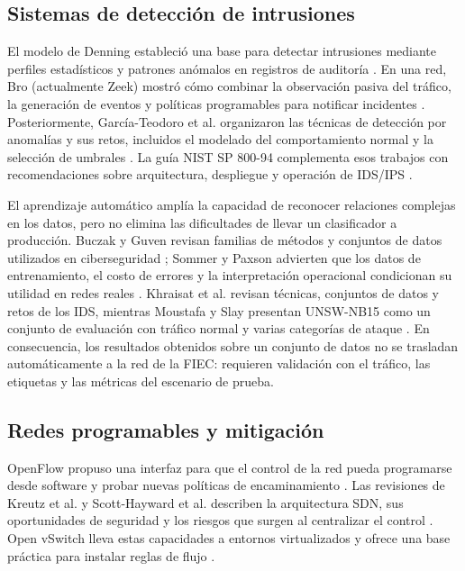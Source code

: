 \subsection{Sistemas de detecci\'on de intrusiones}

El modelo de Denning estableci\'o una base para detectar intrusiones mediante perfiles estad\'isticos y patrones an\'omalos en registros de auditor\'ia \parencite{denning1987}. En una red, Bro (actualmente Zeek) mostr\'o c\'omo combinar la observaci\'on pasiva del tr\'afico, la generaci\'on de eventos y pol\'iticas programables para notificar incidentes \parencite{paxson1999}. Posteriormente, Garc\'ia-Teodoro et al. organizaron las t\'ecnicas de detecci\'on por anomal\'ias y sus retos, incluidos el modelado del comportamiento normal y la selecci\'on de umbrales \parencite{garciateodoro2009}. La gu\'ia NIST SP 800-94 complementa esos trabajos con recomendaciones sobre arquitectura, despliegue y operaci\'on de IDS/IPS \parencite{nist80094}.

El aprendizaje autom\'atico ampl\'ia la capacidad de reconocer relaciones complejas en los datos, pero no elimina las dificultades de llevar un clasificador a producci\'on. Buczak y Guven revisan familias de m\'etodos y conjuntos de datos utilizados en ciberseguridad \parencite{buczak2016}; Sommer y Paxson advierten que los datos de entrenamiento, el costo de errores y la interpretaci\'on operacional condicionan su utilidad en redes reales \parencite{sommer2010}. Khraisat et al. revisan t\'ecnicas, conjuntos de datos y retos de los IDS, mientras Moustafa y Slay presentan UNSW-NB15 como un conjunto de evaluaci\'on con tr\'afico normal y varias categor\'ias de ataque \parencite{khraisat2019,moustafa2015}. En consecuencia, los resultados obtenidos sobre un conjunto de datos no se trasladan autom\'aticamente a la red de la FIEC: requieren validaci\'on con el tr\'afico, las etiquetas y las m\'etricas del escenario de prueba.

\subsection{Redes programables y mitigaci\'on}

OpenFlow propuso una interfaz para que el control de la red pueda programarse desde software y probar nuevas pol\'iticas de encaminamiento \parencite{mckeown2008openflow}. Las revisiones de Kreutz et al. y Scott-Hayward et al. describen la arquitectura SDN, sus oportunidades de seguridad y los riesgos que surgen al centralizar el control \parencite{kreutz2015,scotthayward2016}. Open vSwitch lleva estas capacidades a entornos virtualizados y ofrece una base pr\'actica para instalar reglas de flujo \parencite{openvswitch2015}.

